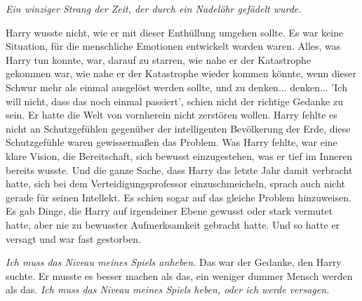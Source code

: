 \emph{Ein winziger Strang der Zeit, der durch ein Nadelöhr gefädelt wurde.}

Harry wusste nicht, wie er mit dieser Enthüllung umgehen sollte. Es war keine
Situation, für die menschliche Emotionen entwickelt worden waren. Alles, was
Harry tun konnte, war, darauf zu starren, wie nahe er der Katastrophe gekommen
war, wie nahe er der Katastrophe wieder kommen könnte, wenn dieser Schwur mehr
als einmal ausgelöst werden sollte, und zu denken... denken... 'Ich will nicht,
dass das noch einmal passiert', schien nicht der richtige Gedanke zu sein. Er
hatte die Welt von vornherein nicht zerstören wollen. Harry fehlte es nicht an
Schutzgefühlen gegenüber der intelligenten Bevölkerung der Erde, diese
Schutzgefühle waren gewissermaßen das Problem. Was Harry fehlte, war eine klare
Vision, die Bereitschaft, sich bewusst einzugestehen, was er tief im Inneren
bereits wusste. Und die ganze Sache, dass Harry das letzte Jahr damit verbracht
hatte, sich bei dem Verteidigungsprofessor einzuschmeicheln, sprach auch nicht
gerade für seinen Intellekt. Es schien sogar auf das gleiche Problem
hinzuweisen. Es gab Dinge, die Harry auf irgendeiner Ebene gewusst oder stark
vermutet hatte, aber nie zu bewusster Aufmerksamkeit gebracht hatte. Und so
hatte er versagt und war fast gestorben.

\emph{Ich muss das Niveau meines Spiels anheben.}
Das war der Gedanke, den Harry suchte. Er musste es besser machen als das, ein
weniger dummer Mensch werden als das.
\emph{Ich muss das Niveau meines Spiels heben, oder ich werde versagen.}


